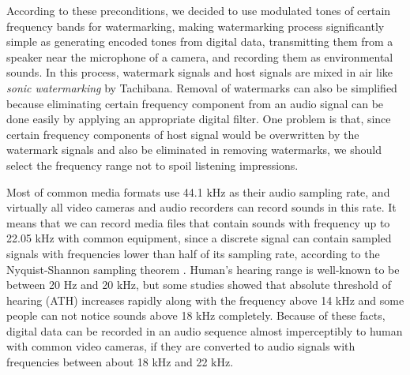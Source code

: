 According to these preconditions, we decided to use modulated tones of certain frequency bands for watermarking, making watermarking process significantly simple as generating encoded tones from digital data, transmitting them from a speaker near the microphone of a camera, and recording them as environmental sounds.
In this process, watermark signals and host signals are mixed in air like {\it sonic watermarking} by Tachibana. \cite{tachibana2003audio}
Removal of watermarks can also be simplified because eliminating certain frequency component from an audio signal can be done easily by applying an appropriate digital filter.
One problem is that, since certain frequency components of host signal would be overwritten by the watermark signals and also be eliminated in removing watermarks, we should select the frequency range not to spoil listening impressions.

Most of common media formats use 44.1 kHz as their audio sampling rate, and virtually all video cameras and audio recorders can record sounds in this rate. It means that we can record media files that contain sounds with frequency up to 22.05 kHz with common equipment, since a discrete signal can contain sampled signals with frequencies lower than half of its sampling rate, according to the Nyquist-Shannon sampling theorem \cite{shannon1949communication}.
Human's hearing range is well-known to be between 20 Hz and 20 kHz, but some studies showed that absolute threshold of hearing (ATH) increases rapidly along with the frequency above 14 kHz and some people can not notice sounds above 18 kHz completely. \cite{:/content/asa/journal/jasa/86/4/10.1121/1.398698, ashihara2006hearing}
Because of these facts, digital data can be recorded in an audio sequence almost imperceptibly to human with common video cameras, if they are converted to audio signals with frequencies between about 18 kHz and 22 kHz.

